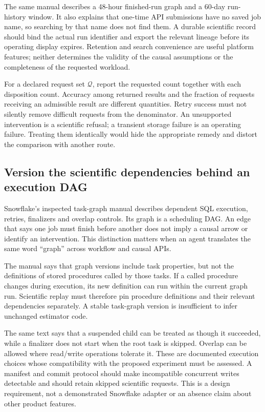 The same manual describes a 48-hour finished-run graph and a 60-day run-history
window. It also explains that one-time API submissions have no saved job name,
so searching by that name does not find them. A durable scientific record
should bind the actual run identifier and export the relevant lineage before
its operating display expires. Retention and search convenience are useful
platform features; neither determines the validity of the causal assumptions
or the completeness of the requested workload.
\citep{exec22_workflow_databricks_monitor}

For a declared request set $\mathcal Q$, report the requested count together
with each disposition count. Accuracy among returned results and the fraction
of requests receiving an admissible result are different quantities. Retry
success must not silently remove difficult requests from the denominator.
An unsupported intervention is a scientific refusal; a transient storage
failure is an operating failure. Treating them identically would hide the
appropriate remedy and distort the comparison with another route.

\subsection{Version the scientific dependencies behind an execution DAG}

Snowflake's inspected task-graph manual describes dependent SQL execution,
retries, finalizers and overlap controls. Its graph is a scheduling DAG. An
edge that says one job must finish before another does not imply a causal
arrow or identify an intervention. This distinction matters when an agent
translates the same word ``graph'' across workflow and causal APIs.
\citep{exec22_workflow_snowflake_graphs}

The manual says that graph versions include task properties, but not the
definitions of stored procedures called by those tasks. If a called procedure
changes during execution, its new definition can run within the current graph
run. Scientific replay must therefore pin procedure definitions and their
relevant dependencies separately. A stable task-graph version is insufficient
to infer unchanged estimator code.
\citep{exec22_workflow_snowflake_graphs}

The same text says that a suspended child can be treated as though it
succeeded, while a finalizer does not start when the root task is skipped.
Overlap can be allowed where read/write operations tolerate it. These are
documented execution choices whose compatibility with the proposed experiment
must be assessed. A manifest and commit protocol should make incompatible
concurrent writes detectable and should retain skipped scientific requests.
This is a design requirement, not a demonstrated Snowflake adapter or an
absence claim about other product features.
\citep{exec22_workflow_snowflake_graphs}

